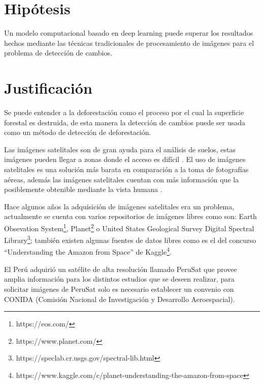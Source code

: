 \section{Hipótesis}
Un modelo computacional basado en deep learning puede superar los resultados hechos mediante las técnicas tradicionales de procesamiento de imágenes para el problema de detección de cambios.


\section{Justificación}
Se puede entender a la deforestación como el proceso por el cual la superficie forestal es destruida, de esta manera la detección de cambios puede ser usada como un método de detección de deforestación.   



Las imágenes satelitales son de gran ayuda para el análisis de suelos, estas imágenes pueden llegar a zonas donde el acceso es difícil \cite{AlenCastro2015}. El uso de imágenes satelitales es una solución más barata en comparación a la toma de fotografías aéreas, además las imágenes satelitales cuentan con más información que la posiblemente obtenible mediante la vista humana \cite{unsalan2013multispectral}.


Hace algunos años la adquisición de imágenes satelitales era un problema, actualmente se cuenta con varios repositorios de imágenes libres como son: Earth Obsevation System\footnote{https://eos.com/}, Planet\footnote{https://www.planet.com/} o United States Geological Survey Digital Spectral Library\footnote{https://speclab.cr.usgs.gov/spectral-lib.html}; también existen algunas fuentes de datos libres como es el del concurso ``Understanding the Amazon from Space'' de Kaggle\footnote{https://www.kaggle.com/c/planet-understanding-the-amazon-from-space}. 


El Perú adquirió un satélite de alta resolución llamado PeruSat que provee amplia información para los distintos estudios que se deseen realizar, para solicitar imágenes de PeruSat solo es necesario establecer un convenio con CONIDA (Comisión Nacional de Investigación y Desarrollo Aeroespacial).

